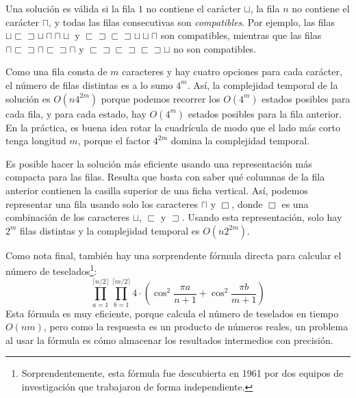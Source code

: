 Una solución es válida si la fila $1$ no contiene
el carácter $\sqcup$,
la fila $n$ no contiene el carácter $\sqcap$,
y todas las filas consecutivas son \emph{compatibles}.
Por ejemplo, las filas
$\sqcup \sqsubset \sqsupset \sqcup \sqcap \sqcap \sqcup$ y
$\sqsubset \sqsupset \sqsubset \sqsupset \sqcup \sqcup \sqcap$
son compatibles, mientras que las filas
$\sqcap \sqsubset \sqsupset \sqcap \sqsubset \sqsupset \sqcap$ y
$\sqsubset \sqsupset \sqsubset \sqsupset \sqsubset \sqsupset \sqcup$
no son compatibles.

Como una fila consta de $m$ caracteres y hay
cuatro opciones para cada carácter, el número de filas
distintas es a lo sumo $4^m$.
Así, la complejidad temporal de la solución es
$O(n 4^{2m})$ porque podemos recorrer los
$O(4^m)$ estados posibles para cada fila,
y para cada estado, hay $O(4^m)$
estados posibles para la fila anterior.
En la práctica, es buena idea rotar la cuadrícula
de modo que el lado más corto tenga longitud $m$,
porque el factor $4^{2m}$ domina la complejidad temporal.

Es posible hacer la solución más eficiente
usando una representación más compacta para las filas.
Resulta que basta con saber qué
columnas de la fila anterior contienen la casilla superior
de una ficha vertical.
Así, podemos representar una fila usando solo los caracteres
$\sqcap$ y $\Box$, donde $\Box$ es una combinación
de los caracteres
$\sqcup$, $\sqsubset$ y $\sqsupset$.
Usando esta representación, solo hay
$2^m$ filas distintas y la complejidad temporal es
$O(n 2^{2m})$.

Como nota final, también hay una sorprendente fórmula directa
para calcular el número de teselados\footnote{Sorprendentemente,
esta fórmula fue descubierta en 1961 por dos equipos de investigación \cite{kas61,tem61}
que trabajaron de forma independiente.}:
\[ \prod_{a=1}^{\lceil n/2 \rceil} \prod_{b=1}^{\lceil m/2 \rceil} 4 \cdot (\cos^2 \frac{\pi a}{n + 1} + \cos^2 \frac{\pi b}{m+1})\]
Esta fórmula es muy eficiente, porque calcula
el número de teselados en tiempo $O(nm)$,
pero como la respuesta es un producto de números reales,
un problema al usar la fórmula es
cómo almacenar los resultados intermedios con precisión.
